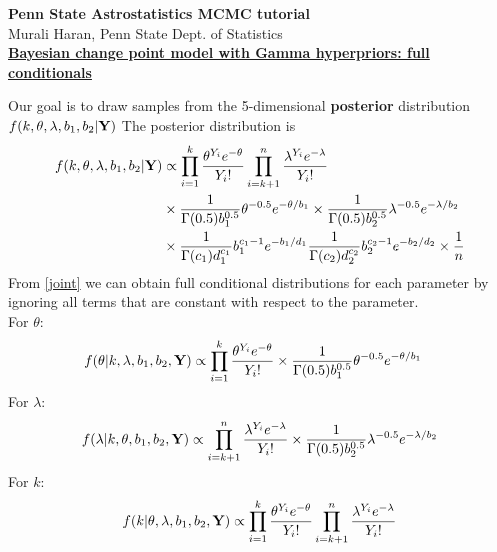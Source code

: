 \documentclass[11pt]{article}
\begin{document}
\pagestyle{empty}
\begin{center}
\Large
{\bf Penn State Astrostatistics MCMC tutorial} \\
\large
Murali Haran, Penn State Dept. of Statistics \\\vspace{0.2in}
{\bf  \underline{Bayesian change point model with Gamma hyperpriors: full conditionals}}\\
\end{center}
Our goal is to draw samples from the 5-dimensional
{\bf posterior} distribution $f(k,\theta,\lambda,b_1,b_2| {\bf Y})$  The posterior distribution is 
\begin{equation}\label{joint}
\begin{split}
f(k,\theta,\lambda,b_1,b_2| {\bf Y}) & \propto \prod_{i=1}^k \frac{\theta^{Y_i} e^{-\theta}}{Y_i !} \prod_{i=k+1}^n \frac{\lambda^{Y_i} e^{-\lambda}}{Y_i !} \\
& \times  \frac{1}{\Gamma(0.5)b_1^{0.5}} \theta^{-0.5} e^{-\theta/b_1} \times \frac{1}{\Gamma(0.5)b_2^{0.5}} \lambda^{-0.5} e^{-\lambda/b_2}\\ 
& \times \frac{1}{\Gamma(c_1) d_1^{c_1}} b_1^{c_1-1} e^{-b_1/d_1}  \frac{1}{\Gamma(c_2) d_2^{c_2}} b_2^{c_2-1} e^{-b_2/d_2} \times \frac{1}{n}
\end{split}
\end{equation}
From \ref{joint} we can obtain full conditional distributions for each parameter by ignoring all terms that are constant with respect to the parameter.\\
For $\theta$:
\begin{equation}
\begin{split}
  f(\theta|k,\lambda,b_1,b_2,{\bf Y}) & \propto \prod_{i=1}^k
  \frac{\theta^{Y_i} e^{-\theta}}{Y_i !} \times
  \frac{1}{\Gamma(0.5)b_1^{0.5}} \theta^{-0.5} e^{-\theta/b_1}
\end{split}
\end{equation}
For $\lambda$:
\begin{equation}
f(\lambda|k,\theta,b_1,b_2,{\bf Y}) \propto \prod_{i=k+1}^n \frac{\lambda^{Y_i} e^{-\lambda}}{Y_i !} \times \frac{1}{\Gamma(0.5)b_2^{0.5}} \lambda^{-0.5} e^{-\lambda/b_2}
\end{equation}
For $k$:
\begin{equation}
f(k|\theta,\lambda,b_1,b_2,{\bf Y}) \propto \prod_{i=1}^k \frac{\theta^{Y_i} e^{-\theta}}{Y_i !} \prod_{i=k+1}^n \frac{\lambda^{Y_i} e^{-\lambda}}{Y_i !}
\end{equation}
\end{document}
